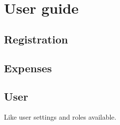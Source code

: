 \chapter{User guide}

\section{Registration}

\section{Expenses}

\section{User}

Like user settings and roles available.




